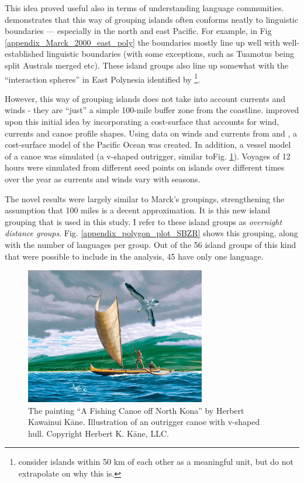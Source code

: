 \documentclass[12pt,letterpaper]{article}
\begin{document}
This idea proved useful also in terms of understanding language communities. \citet{mark_1986, marck2000} demonstrates that this way of grouping islands often conforms neatly to linguistic boundaries --- especially in the north and east Pacific. For example, in Fig  \ref{appendix_Marck_2000_east_poly} the boundaries mostly line up well with well-established linguistic boundaries (with some exceptions, such as Tuamotus being split Australs merged etc). These island groups also line up somewhat with the ``interaction spheres'' in East Polynesia identified by \citet{rolett2002voyaging}\footnote{\citet{rolett2004environmental} consider islands within 50 km of each other as a meaningful unit, but do not extrapolate on why this is.}. 

However, this way of grouping islands does not take into account currents and winds - they are ``just'' a simple 100-mile buffer zone from the coastline. \citet{NZSA_overnight_2023} improved upon this initial idea by incorporating a cost-surface that accounts for wind, currents and canoe profile shapes. Using data on winds and currents from 
\citet{noaa_2019} and \citet{apdrc_2014}, a cost-surface model of the Pacific Ocean was created. In addition, a vessel model of a canoe was simulated (a v-shaped outrigger, similar toFig. \ref{appendix_kane_fishing_canoe}). Voyages of 12 hours were simulated from different seed points on islands over different times over the year as currents and winds vary with seasons.  

The novel results were largely similar to Marck's groupings, strengthening the assumption that 100 miles is a decent approximation. It is this new island grouping that is used in this study. I refer to these island groups as \textit{overnight distance groups}. Fig. \ref{appendix_polygon_plot_SBZR} shows this grouping, along with the number of languages per group. Out of the 56 island groups of this kind that were possible to include in the analysis, 45 have only one language.


\begin{figure}[ht]
\centering
\includegraphics[width=0.7\textwidth]{Herb-Kane_Fishing-Canoe-off-North-Kona.jpg}
\caption{{The painting ``A Fishing Canoe off North Kona'' by Herbert Kawainui K{\=a}ne. Illustration of an outrigger canoe with v-shaped hull. Copyright Herbert K. K{\=a}ne, LLC.}}
\label{appendix_kane_fishing_canoe}
\end{figure}
\end{document}
